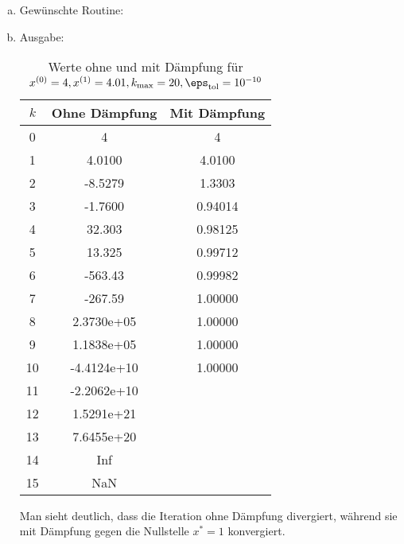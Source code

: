 \documentclass{mywork}
\begin{document}
\setcounter{aufgabe}{3}
 
\begin{aufgabe}
	
	\begin{enumerate}[a)]
		\item
			Gewünschte Routine:
			
		\item
			Ausgabe:
			
			\begin{table}[h]
				\caption{Werte ohne und mit Dämpfung für $x^{(0)}=4, x^{(1)}=4.01, k_{\text{max}}=20, \eps_{\text{tol}}=10^{-10}$}
				\centering
				\begin{tabular}{c|c|c}
					$k$ & Ohne Dämpfung & Mit Dämpfung \\ \hline
					0 & 4 & 4 \\
					1 & 4.0100 & 4.0100 \\
					2 & -8.5279 & 1.3303 \\
					3 & -1.7600 & 0.94014 \\
					4 & 32.303 & 0.98125 \\
					5 & 13.325 & 0.99712 \\
					6 & -563.43 & 0.99982 \\
					7 & -267.59 & 1.00000 \\
					8 & 2.3730e+05 & 1.00000 \\
					9 & 1.1838e+05 & 1.00000 \\
					10 & -4.4124e+10 & 1.00000 \\
					11 & -2.2062e+10 &  \\
					12 & 1.5291e+21 &  \\
					13 & 7.6455e+20 & \\
					14 & Inf & \\
					15 & NaN
				\end{tabular}				
			\end{table}
			Man sieht deutlich, dass die Iteration ohne Dämpfung divergiert, während sie mit Dämpfung gegen die Nullstelle $x^* = 1$ konvergiert.

	\end{enumerate}
\end{aufgabe}
\end{document}
